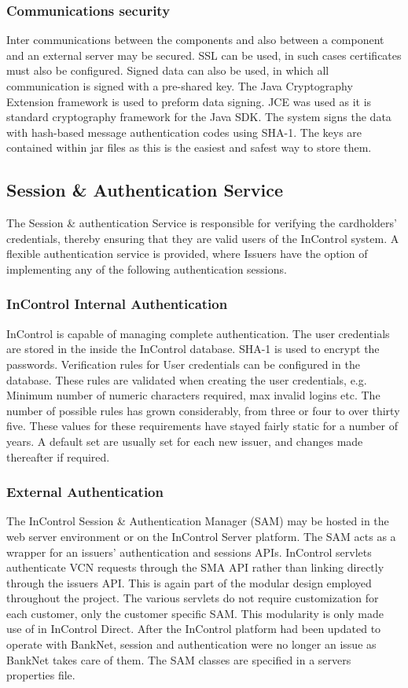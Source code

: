 \documentclass[a4paper, 11pt, titlepage]{article}
\begin{document}
\subsubsection{Communications security} 
Inter communications between the components and also between a component and an external server may be secured. SSL can be used, in such cases certificates must also be configured. Signed data can also be used, in which all communication is signed with a pre-shared key. The Java Cryptography Extension framework is used to preform data signing. JCE was used as it is standard cryptography framework for the Java SDK. The system signs the data with hash-based message authentication codes using SHA-1. The keys are contained within jar files as this is the easiest and safest way to store them. 
 
\subsection{Session \& Authentication Service} 
The Session \& authentication Service is responsible for verifying the cardholders’ credentials, thereby ensuring that they are valid users of the InControl system. 
A flexible authentication service is provided, where Issuers have the option of implementing any of the following authentication sessions. 
 
\subsubsection{InControl Internal Authentication} 
InControl is capable of managing complete authentication. The user credentials are stored in the inside the InControl database. SHA-1 is used to encrypt the passwords. 
Verification rules for User credentials can be configured in the database. These rules are validated when creating the user credentials, e.g. Minimum number of numeric characters required, max invalid logins etc. The number of possible rules has grown considerably, from three or four to over thirty five. These values for these requirements have stayed fairly static for a number of years. A default set are usually set for each new issuer, and changes made thereafter if required.  
 
\subsubsection{External Authentication} 
The InControl Session \& Authentication Manager (SAM) may be hosted in the web server environment or on the InControl Server platform. The SAM acts as a wrapper for an issuers' authentication and sessions APIs. InControl servlets authenticate VCN requests through the SMA API rather than linking directly through the issuers API. This is again part of the modular design employed throughout the project. The various servlets do not require customization for each customer, only the customer specific SAM. This modularity is only made use of in InControl Direct. After the InControl platform had been updated to operate with BankNet, session and authentication were no longer an issue as BankNet takes care of them. 
The SAM classes are specified in a servers properties file. 
 
\end{document}
